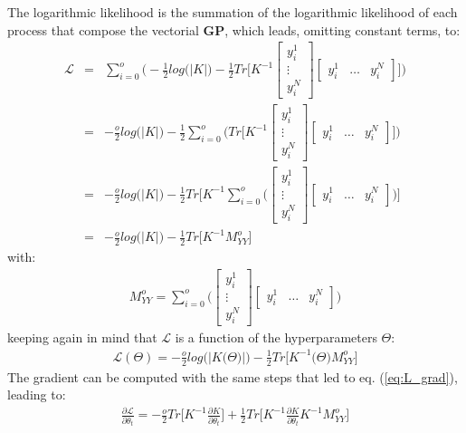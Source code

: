 \documentclass{article}
\begin{document}
The logarithmic likelihood is the summation of the logarithmic likelihood of each process that compose the vectorial \textbf{GP}, which leads, omitting constant terms, to:
\begin{eqnarray}
\mathcal{L} &=& 
\sum_{i=0}^o \bigg (
-\frac{1}{2} log \big (\left | K \right | \big )
-\frac{1}{2} Tr \bigg [
K^{-1} 
\begin{bmatrix} y^1_i \\ \vdots \\ y^N_i \end{bmatrix}
\begin{bmatrix} y^1_i & \hdots & y^N_i \end{bmatrix}
\bigg ] \bigg )  \\
&=&
-\frac{o}{2} log \big (\left | K \right | \big )
-\frac{1}{2} \sum_{i=0}^o \bigg ( Tr \bigg [
K^{-1} 
\begin{bmatrix} y^1_i \\ \vdots \\ y^N_i \end{bmatrix}
\begin{bmatrix} y^1_i & \hdots & y^N_i \end{bmatrix}
\bigg ] 
\bigg ) \\
&=&
-\frac{o}{2} log \big (\left | K \right | \big )
-\frac{1}{2} Tr \bigg [
K^{-1} \sum_{i=0}^o \bigg (
\begin{bmatrix} y^1_i \\ \vdots \\ y^N_i \end{bmatrix}
\begin{bmatrix} y^1_i & \hdots & y^N_i \end{bmatrix}
\bigg )
\bigg ] \\
&=&
-\frac{o}{2} log \big (\left | K \right | \big )
-\frac{1}{2} Tr \bigg [
K^{-1} M^o_{YY}
\bigg ] 
\end{eqnarray}
with:
\begin{eqnarray}
M^o_{YY} = \sum_{i=0}^o \bigg (
\begin{bmatrix} y^1_i \\ \vdots \\ y^N_i \end{bmatrix}
\begin{bmatrix} y^1_i & \hdots & y^N_i \end{bmatrix}
\bigg )
\end{eqnarray}
keeping again in mind that $\mathcal{L}$ is a function of the hyperparameters $\Theta$:
\begin{eqnarray}
\mathcal{L}(\Theta) = -\frac{o}{2} log \big (\left | K \big (\Theta \big ) \right | \big )
-\frac{1}{2} Tr \bigg [
K^{-1}\big (\Theta \big ) M^o_{YY}
\bigg ] 
\end{eqnarray}
The gradient can be computed with the same steps that led to 
eq. (\ref{eq:L_grad}), leading to:
\begin{eqnarray}
\frac{\partial \mathcal{L}}{\partial \theta_t} = 
-\frac{o}{2} Tr \bigg [ K^{-1} \frac{\partial K}{\partial \theta_t} \bigg ]
+\frac{1}{2} Tr \bigg [ K^{-1} \frac{\partial K}{\partial \theta_t} K^{-1} M^o_{YY} \bigg ]
\end{eqnarray}
\end{document}
